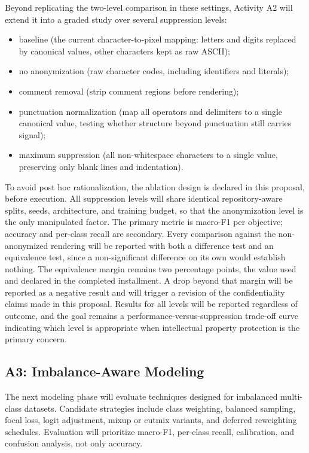 Beyond replicating the two-level comparison in these settings, Activity A2 will
extend it into a graded study over several suppression levels:

\begin{itemize}
    \item baseline (the current character-to-pixel mapping: letters and digits
    replaced by canonical values, other characters kept as raw ASCII);
    \item no anonymization (raw character codes, including identifiers and literals);
    \item comment removal (strip comment regions before rendering);
    \item punctuation normalization (map all operators and delimiters to a single
    canonical value, testing whether structure beyond punctuation still carries signal);
    \item maximum suppression (all non-whitespace characters to a single value,
    preserving only blank lines and indentation).
\end{itemize}

To avoid post hoc rationalization, the ablation design is declared in this
proposal, before execution. All suppression levels will share identical
repository-aware splits, seeds, architecture, and training budget, so that the
anonymization level is the only manipulated factor. The primary metric is
macro-F1 per objective; accuracy and per-class recall are secondary. Every
comparison against the non-anonymized rendering will be reported with both a
difference test and an equivalence test, since a non-significant difference on
its own would establish nothing. The equivalence margin remains two percentage
points, the value used and declared in the completed installment. A drop beyond
that margin will be reported as a negative result and will trigger a revision of
the confidentiality claims made in this proposal. Results for all levels will be reported regardless of outcome, and
the goal remains a performance-versus-suppression trade-off curve indicating
which level is appropriate when intellectual property protection is the
primary concern.

\subsection{A3: Imbalance-Aware Modeling}

The next modeling phase will evaluate techniques designed for imbalanced
multi-class datasets. Candidate strategies include class weighting, balanced
sampling, focal loss, logit adjustment, mixup or cutmix variants, and deferred
reweighting schedules. Evaluation will prioritize macro-F1, per-class recall,
calibration, and confusion analysis, not only accuracy.


